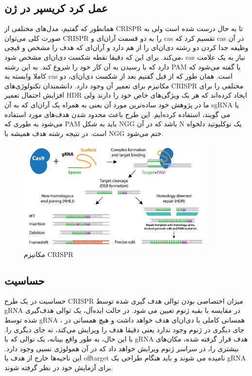 \documentclass[12pt,a4paper,BCOR=.7cm,headsepline,bibliography=totoc]{report}
\begin{document}
\subsection{عمل کرد کریسپر در ژن}
همانطور که گفتیم، مدل‌های مختلفی از CRISPR تا به حال درست شده است ولی به صورت کلی می‌توان CRISPR را به دو قسمت آر‌ان‌ای و  cas تقسیم کرد که cas در آن وظیفه جدا کردن دو رشته دی‌ان‌ای را از هم دارد و آر‌ان‌ای که هدف را مشخص و قیچی می‌کند. برای این که دقیقا نقطه شکست دی‌ان‌ای مشخص شود، cas نیاز به یک علامت دارد که با رسیدن به آن کار خود را شروع کند. به این رشته PAM یا 
گفته می‌شود که کاملا وابسته به cas است. همان طور که از قبل گفتیم بعد از شکست دی‌ان‌ای، دو مکانیزم برای تعمیر آن وجود دارد. دانشمندان تکنولوژی‌های CRISPR مختلفی را برای افزایش احتمال تعمیر HDR ایجاد کرده‌اند که هر یک ویژگی‌های خاص خود را دارند ولی ما در پژوهش خود ساده‌ترین مورد آن یعنی  به همراه یک آر‌ان‌ای که به آن sgRNA یا 
می گویند، استفاده کرده‌ایم. این طرح باعث محدود شدن هدف‌های مورد استفاده می‌شود به طوری که ‌PAM باید به شکل NGG باشد که در آن N یک نوکلیوتید دلخواه است. در نتیجه رشته هدف همیشه با NGG ختم می‌شود. 
\begin{figure}[!h]
\centering
\includegraphics[width=10cm, ]{pictures/cut.png}
\caption{
مکانیزم CRISPR \cite{addgene}
}\label{fig:2}
\end{figure}
 
\subsection{حساسیت}
حساسیت در یک طرح CRISPR میزان اختصاصی بودن توالی هدف گیری شده توسط gRNA در مقایسه با بقیه ژنوم تعیین می شود. در حالت ایده‌آل، یک توالی هدف‌گیری شده توسط gRNA ، همسانی کاملی با دی‌ان‌ای هدف خواهد داشت و هیچ همسانی در جای دیگری در ژنوم وجود ندارد یعنی دقیقا هدف را ویرایش می‌کند، نه جای دیگری را. با این حال، به طور واقع بینانه، یک توالی که با gRNA هدف قرار گرفته شده، مکان‌های بیشتری را، در سراسر ژنوم ویرایش خواهد داد که در آن همولوژی نسبی وجود دارد. این ناحیه‌ها خارج از هدف یا offtarget نامیده می شوند و باید هنگام طراحی یک gRNA برای آزمایش خود در نظر گرفته شوند.
\end{document}

